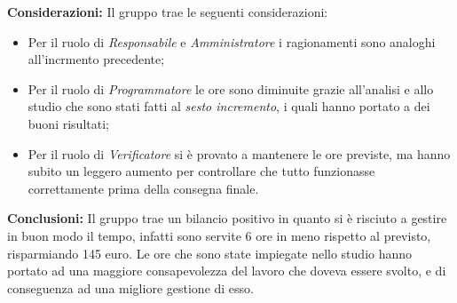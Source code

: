 {\begin{longtable}{C{.4\freewidth} C{.2\freewidth} C{.2\freewidth} C{.2\freewidth}}
                \end{longtable}
                \textbf{Considerazioni:} Il gruppo trae le seguenti considerazioni:
                \begin{itemize}
                    \item Per il ruolo di \textit{Responsabile} e \textit{Amministratore} i ragionamenti sono analoghi all'incrmento precedente;
                    \item Per il ruolo di \textit{Programmatore} le ore sono diminuite grazie all'analisi e allo studio che sono stati fatti al \textit{sesto incremento}, i quali hanno portato a dei buoni risultati;
                    \item Per il ruolo di \textit{Verificatore} si è provato a mantenere le ore previste, ma hanno subito un leggero aumento per controllare che tutto funzionasse correttamente prima della consegna finale.
                \end{itemize} 
                \textbf{Conclusioni:} Il gruppo trae un bilancio positivo in quanto si è risciuto a gestire in buon modo il tempo, infatti sono servite 6 ore in meno rispetto al previsto, risparmiando 145 euro. Le ore che sono state impiegate nello studio hanno 
                portato ad una maggiore consapevolezza del lavoro che doveva essere svolto, e di conseguenza ad una migliore gestione di esso.
            }
            
